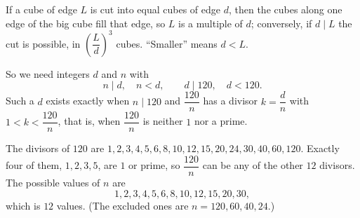 If a cube of edge $L$ is cut into equal cubes of edge $d$, then the cubes along one edge of the big cube fill that edge, so $L$ is a multiple of $d$; conversely, if $d\mid L$ the cut is possible, in $\left(\dfrac {L}{d}\right)^3$ cubes. ``Smaller'' means $d<L$.

So we need integers $d$ and $n$ with
\[
n\mid d,\quad n<d,\qquad d\mid120,\quad d<120 .
\]
Such a $d$ exists exactly when $n\mid120$ and $\dfrac{120}{n}$ has a divisor $k=\dfrac {d}{n}$ with $1<k<\dfrac{120}{n}$, that is, when $\dfrac{120}{n}$ is neither $1$ nor a prime.

The divisors of $120$ are $1,2,3,4,5,6,8,10,12,15,20,24,30,40,60,120$. Exactly four of them, $1,2,3,5$, are $1$ or prime, so $\dfrac{120}{n}$ can be any of the other $12$ divisors. The possible values of $n$ are
\[
1,2,3,4,5,6,8,10,12,15,20,30,
\]
which is $\boxed{12}$ values. (The excluded ones are $n=120,60,40,24$.)
